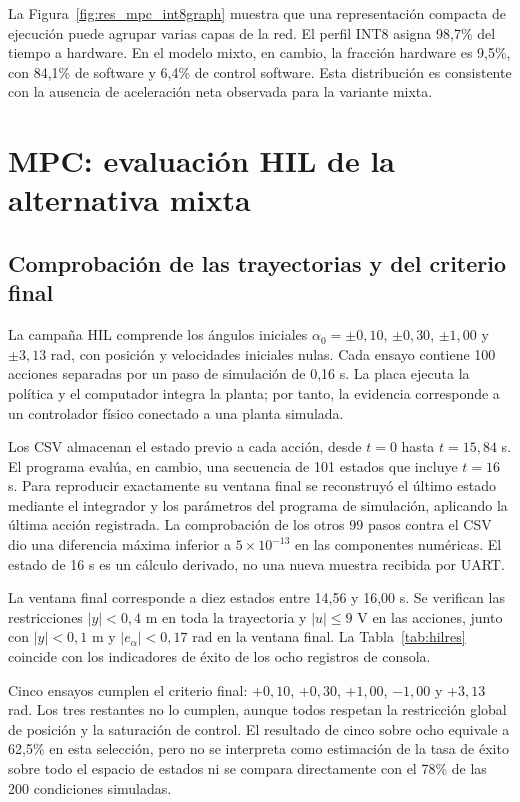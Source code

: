 La Figura~\ref{fig:res_mpc_int8graph} muestra que una representación compacta de ejecución puede agrupar varias capas de la red. El perfil INT8 asigna 98,7\% del tiempo a hardware. En el modelo mixto, en cambio, la fracción hardware es 9,5\%, con 84,1\% de software y 6,4\% de control software. Esta distribución es consistente con la ausencia de aceleración neta observada para la variante mixta.

\FloatBarrier
\section{MPC: evaluación HIL de la alternativa mixta}
\FloatBarrier
\subsection{Comprobación de las trayectorias y del criterio final}
La campaña HIL comprende los ángulos iniciales $\alpha_0=\pm0{,}10$, $\pm0{,}30$, $\pm1{,}00$ y $\pm3{,}13$ rad, con posición y velocidades iniciales nulas. Cada ensayo contiene 100 acciones separadas por un paso de simulación de 0,16 s. La placa ejecuta la política y el computador integra la planta; por tanto, la evidencia corresponde a un controlador físico conectado a una planta simulada.

Los CSV almacenan el estado previo a cada acción, desde $t=0$ hasta $t=15{,}84$ s. El programa evalúa, en cambio, una secuencia de 101 estados que incluye $t=16$ s. Para reproducir exactamente su ventana final se reconstruyó el último estado mediante el integrador y los parámetros del programa de simulación, aplicando la última acción registrada. La comprobación de los otros 99 pasos contra el CSV dio una diferencia máxima inferior a $5\times10^{-13}$ en las componentes numéricas. El estado de 16 s es un cálculo derivado, no una nueva muestra recibida por UART.

La ventana final corresponde a diez estados entre 14,56 y 16,00 s. Se verifican las restricciones $|y|<0{,}4$ m en toda la trayectoria y $|u|\leq9$ V en las acciones, junto con $|y|<0{,}1$ m y $|e_\alpha|<0{,}17$ rad en la ventana final. La Tabla~\ref{tab:hilres} coincide con los indicadores de éxito de los ocho registros de consola.


Cinco ensayos cumplen el criterio final: $+0{,}10$, $+0{,}30$, $+1{,}00$, $-1{,}00$ y $+3{,}13$ rad. Los tres restantes no lo cumplen, aunque todos respetan la restricción global de posición y la saturación de control. El resultado de cinco sobre ocho equivale a 62,5\% en esta selección, pero no se interpreta como estimación de la tasa de éxito sobre todo el espacio de estados ni se compara directamente con el 78\% de las 200 condiciones simuladas.


